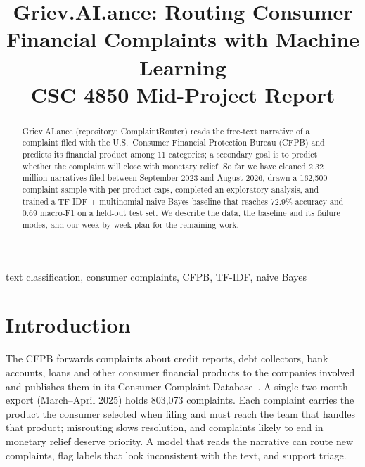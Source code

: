 \documentclass[conference]{IEEEtran}
\begin{document}
\title{Griev.AI.ance: Routing Consumer Financial Complaints with Machine Learning\\
{\large CSC 4850 Mid-Project Report}}

\author{
\and
{}
\and
{}
}

\maketitle

\begin{abstract}
Griev.AI.ance (repository: ComplaintRouter) reads the free-text narrative of a complaint filed with the U.S.\ Consumer Financial Protection Bureau (CFPB) and predicts its financial product among 11 categories; a secondary goal is to predict whether the complaint will close with monetary relief. So far we have cleaned 2.32 million narratives filed between September 2023 and August 2026, drawn a 162,500-complaint sample with per-product caps, completed an exploratory analysis, and trained a TF-IDF + multinomial naive Bayes baseline that reaches 72.9\% accuracy and 0.69 macro-F1 on a held-out test set. We describe the data, the baseline and its failure modes, and our week-by-week plan for the remaining work.
\end{abstract}

\begin{IEEEkeywords}
text classification, consumer complaints, CFPB, TF-IDF, naive Bayes
\end{IEEEkeywords}

\section{Introduction}
The CFPB forwards complaints about credit reports, debt collectors, bank accounts, loans and other consumer financial products to the companies involved and publishes them in its Consumer Complaint Database~\cite{cfpb}. A single two-month export (March--April 2025) holds 803,073 complaints. Each complaint carries the product the consumer selected when filing and must reach the team that handles that product; misrouting slows resolution, and complaints likely to end in monetary relief deserve priority. A model that reads the narrative can route new complaints, flag labels that look inconsistent with the text, and support triage.
\end{document}
